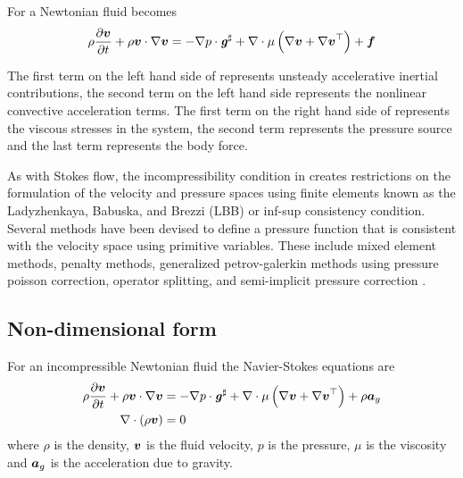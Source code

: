 For a Newtonian fluid  becomes
\begin{equation}
  \rho\delby{\vectr{v}}{t}
  +\dotprod{\rho\vectr{v}}{\gradient{}{\vectr{v}}}
  =\dotprod{-\gradient{}{p}}{\sharptensor{\tensor{g}}}
  +\divergence{}{\mu\pbrac{\gradient{}{\vectr{v}+\transpose{\gradient{}{\vectr{v}}}}}}
  +\vectr{f}
  \label{eqn:DiffIncompNewtonianNSEMomentum}
\end{equation}

The first term on the left hand side of 
represents unsteady accelerative inertial contributions, the second term on
the left hand side represents the nonlinear convective acceleration terms. The
first term on the right hand side of 
represents the viscous stresses in the system, the second term represents the
pressure source and the last term represents the body force.

As with Stokes flow, the incompressibility condition in
 creates restrictions on the formulation of
the velocity and pressure spaces using finite elements known as the
Ladyzhenkaya, Babuska, and Brezzi (LBB) or inf-sup consistency
condition. Several methods have been devised to define a pressure function
that is consistent with the velocity space using primitive variables. These
include mixed element methods, penalty methods, generalized petrov-galerkin
methods using pressure poisson correction, operator splitting, and
semi-implicit pressure correction \cite{chung:2010}.

\subsection{Non-dimensional form}
\label{subsec:NonDimensionalNavierStokes}

For an incompressible Newtonian fluid the Navier-Stokes equations are
\begin{align}
  \rho\delby{\vectr{v}}{t}
  +\dotprod{\rho\vectr{v}}{\gradient{}{\vectr{v}}}
  &=\dotprod{-\gradient{}{p}}{\sharptensor{\tensor{g}}}
  +\divergence{}{\mu\pbrac{\gradient{}{\vectr{v}+\transpose{\gradient{}{\vectr{v}}}}}}
  +\rho\vectr{a}_{g} \label{eqn:DiffIncompNSEMomentumNonDim} \\
  \divergence{}{\pbrac{\rho\vectr{v}}}&=0 \label{eqn:DiffIncompNSEMassNonDim}
\end{align}
where $\rho$ is the density, $ \boldsymbol{v} $ is the fluid velocity, $p$ is
the pressure, $\mu$ is the viscosity and $ \boldsymbol{a} _{g}$ is the
acceleration due to gravity.

